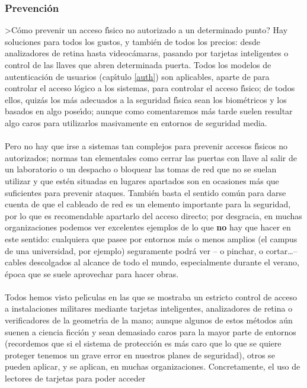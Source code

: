 \subsubsection{Prevenci\'on}
>C\'omo prevenir un acceso f\'{\i}sico no autorizado a un determinado punto? 
Hay soluciones para todos los gustos, y tambi\'en de todos los precios: desde
analizadores de retina hasta videoc\'amaras, pasando por tarjetas inteligentes
o control de las llaves que abren determinada puerta. Todos los modelos de
autenticaci\'on de usuarios (cap\'{\i}tulo \ref{auth}) son aplicables, aparte
de para controlar el acceso l\'ogico a los sistemas, para controlar el acceso
f\'{\i}sico; de todos ellos, quiz\'as los m\'as adecuados a la seguridad
f\'{\i}sica sean los biom\'etricos y los basados en algo pose\'{\i}do; aunque
como comentaremos m\'as tarde suelen resultar algo caros para utilizarlos 
masivamente en entornos de seguridad media.\\
\\Pero no hay que irse a sistemas tan complejos para prevenir accesos 
f\'{\i}sicos no autorizados; normas tan elementales como cerrar las puertas 
con llave al salir de un laboratorio o un despacho o bloquear las tomas de
red que no se suelan utilizar y que est\'en situadas en lugares apartados son
en ocasiones m\'as que suficientes para prevenir ataques. Tambi\'en basta el
sentido com\'un para darse cuenta de que el cableado de red es un elemento 
importante para la seguridad, por lo que es recomendable apartarlo del acceso
directo; por desgracia, en muchas organizaciones podemos ver excelentes
ejemplos de lo que {\bf no} hay que hacer en este sentido: cualquiera que 
pasee por entornos m\'as o menos amplios (el campus de una universidad, por
ejemplo) seguramente podr\'a ver -- o pinchar, o cortar\ldots -- cables 
descolgados al alcance de todo el mundo, especialmente durante el verano, 
\'epoca que se suele aprovechar para hacer obras.\\ 
\\Todos hemos visto pel\'{\i}culas en las que se mostraba un estricto control
de acceso a instalaciones militares mediante tarjetas inteligentes, analizadores
de retina o verificadores de la geometr\'{\i}a de la mano; aunque algunos de
estos m\'etodos a\'un suenen a ciencia ficci\'on y sean demasiado caros para
la mayor parte de entornos (recordemos que si el sistema de protecci\'on es
m\'as caro que lo que se quiere proteger tenemos un grave error en nuestros
planes de seguridad), otros se pueden aplicar, y se aplican, en muchas 
organizaciones. Concretamente, el uso de lectores de tarjetas para poder acceder
